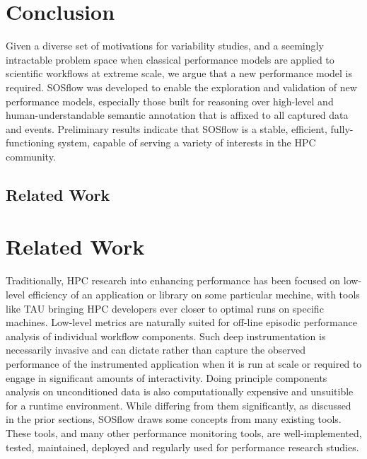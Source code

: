 
\section{Conclusion}

Given a diverse set of motivations for variability studies, and a
seemingly intractable problem space when classical performance models
are applied to scientific workflows at extreme scale, we argue that a
new performance model is required.
%
SOSflow was developed to enable the exploration and validation of new
performance models, especially those built for reasoning over
high-level and human-understandable semantic annotation that is
affixed to all captured data and events.
%
Preliminary results indicate that SOSflow is a stable, efficient,
fully-functioning system, capable of serving a variety of interests in
the HPC community.



\subsection{Related Work}

\section{Related Work}

Traditionally, HPC research into enhancing performance has been
focused on low-level efficiency of an application or library on some
particular mechine, with tools like TAU bringing HPC developers ever
closer to optimal runs on specific machines.
%
Low-level metrics are naturally suited for off-line episodic
performance analysis of individual workflow components.
%
Such deep instrumentation is necessarily invasive and can dictate
rather than capture the observed performance of the instrumented
application when it is run at scale or required to engage in
significant amounts of interactivity.
%
Doing principle components analysis on unconditioned data is also
computationally expensive and unsuitible for a runtime environment.
%
While differing from them significantly, as discussed in the prior
sections, SOSflow draws some concepts from many existing tools.
%
These tools, and many other performance monitoring tools, are
well-implemented, tested, maintained, deployed and regularly used for
performance research studies.

